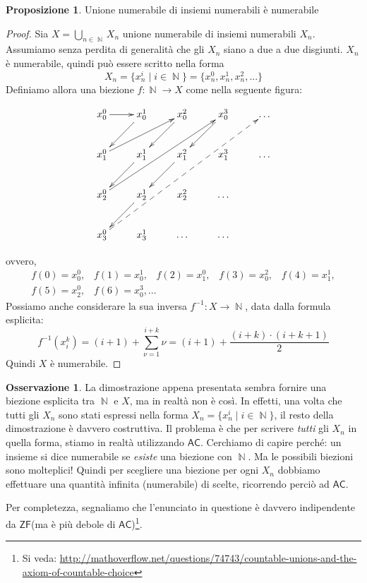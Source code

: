 \documentclass[12pt,a4paper]{report}
\theoremstyle{definition}
\newtheorem{oss}[teo]{Osservazione}  %
\newtheorem{prop}[teo]{Proposizione}  %
\theoremstyle{num.custom-title}
\DeclareMathOperator{\N}{\mathbb{N}}
\newcommand{\AC}{\ensuremath{\mathsf{AC}}\xspace}
\newcommand{\ZF}{\ensuremath{\mathsf{ZF}}\xspace}
\begin{document}
\begin{prop}\label{unione_num}
Unione numerabile di insiemi numerabili è numerabile
\begin{proof}
Sia $X=\bigcup_{n \in \N} X_n$ unione numerabile di insiemi numerabili $X_n$. Assumiamo senza perdita di generalità che gli $X_n$ siano a due a due disgiunti. $X_n$ è numerabile, quindi può essere scritto nella forma
\[
X_n = \{x_n^i \mid i \in \N\} = \{x_n^0, x_n^1, x_n^2, ...\}
\]
Definiamo allora una biezione $f : \N \to X$ come nella seguente figura:

\begin{displaymath}
    \xymatrix{ 
	x_0^0 \ar[r] & x_0^1 \ar[dl] & x_0^2 \ar[dl] & x_0^3 \ar[dl] &\dots \\
	x_1^0 \ar[urr] & x_1^1 \ar[dl] & x_1^2 \ar[dl] & x_1^3 & \dots \\
	x_2^0 \ar[uurrr] & x_2^1 \ar[dl] & x_2^2 & \dots \\
	x_3^0 \ar@{-->}[uuurrrr] & x_3^1 & \dots & \dots
	}
\end{displaymath}

ovvero, 
\[
\begin{array}{l}
f(0)=x_0^0, \;\;\; f(1)=x_0^1, \;\;\; f(2)=x_1^0, \;\;\; f(3)=x_0^2, \;\;\; f(4)=x_1^1, \\
f(5)=x_2^0, \;\;\; f(6)=x_0^3, ...
\end{array}
\]
Possiamo anche considerare la sua inversa $f^{-1} : X \to \N$, data dalla formula esplicita:
\[
f^{-1}(x_i^k) = (i+1) + \sum_{\nu=1}^{i+k} \nu = (i+1) + \frac{(i+k) \cdot (i+k+1)}{2}
\]
Quindi $X$ è numerabile.
\end{proof}
\end{prop}

\begin{oss}
La dimostrazione appena presentata sembra fornire una biezione esplicita tra $\N$ e $X$, ma in realtà non è così. In effetti, una volta che tutti gli $X_n$ sono stati espressi nella forma $X_n = \{x_n^i \mid i \in \N\}$, il resto della dimostrazione è davvero costruttiva. Il problema è che per scrivere \emph{tutti} gli $X_n$ in quella forma, stiamo in realtà utilizzando \AC. Cerchiamo di capire perché: un insieme si dice numerabile se \emph{esiste} una biezione con $\N$. Ma le possibili biezioni sono molteplici! Quindi per scegliere una biezione per ogni $X_n$ dobbiamo effettuare una quantità infinita (numerabile) di scelte, ricorrendo perciò ad \AC.

Per completezza, segnaliamo che l'enunciato in questione è davvero indipendente da \ZF (ma è più debole di \AC)\footnote{Si veda: \url{http://mathoverflow.net/questions/74743/countable-unions-and-the-axiom-of-countable-choice}}.
\end{oss}
\end{document}
